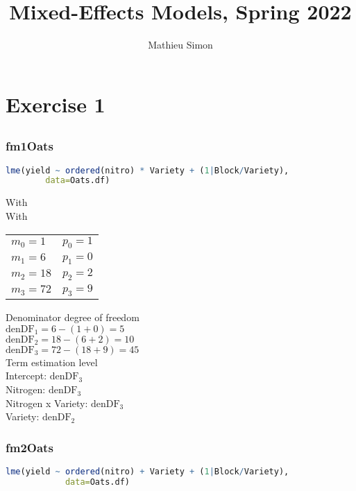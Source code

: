 \documentclass[a4paper,12pt]{article}
\begin{document}
	
	\title{Mixed-Effects Models, Spring 2022}
	\author{Mathieu Simon}
	\maketitle
	
	\setlength{\parskip}{1em}
	
	\section{Exercise 1}
	
	\subsection{}
	
		\subsubsection*{fm1Oats}
		\begin{lstlisting}[language=R]
lme(yield ~ ordered(nitro) * Variety + (1|Block/Variety),
	    data=Oats.df)
		\end{lstlisting}
	
		With\\[1mm]
		With\\[1mm]
		\begin{tabular}{m{9cm}m{5cm}}
			$m_0 = 1$ & $p_0 = 1$ \\
			$m_1 = 6$ & $p_1 = 0$ \\
			$m_2 = 18$ & $p_2 = 2$ \\
			$m_3 = 72$ & $p_3 = 9$
		\end{tabular}
		
		Denominator degree of freedom\\[1mm]
		$\text{denDF}_1 = 6 - (1 + 0) = 5$\\
		$\text{denDF}_2 = 18 - (6 + 2) = 10$\\
		$\text{denDF}_3 = 72 - (18 + 9) = 45$\\
		
		Term estimation level\\[1mm]
		Intercept: $\text{denDF}_3$\\
		Nitrogen: $\text{denDF}_3$\\
		Nitrogen x Variety: $\text{denDF}_3$\\
		Variety: $\text{denDF}_2$\\[2em]
		
		
		\subsubsection*{fm2Oats}
		\begin{lstlisting}[language=R]
lme(yield ~ ordered(nitro) + Variety + (1|Block/Variety),
            data=Oats.df)
		\end{lstlisting}
		
\end{document}
